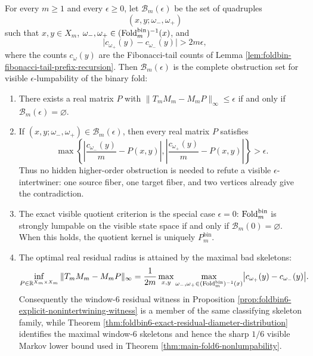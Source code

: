\begin{theorem}\label{thm:foldbin-bad-skeleton-classification}
For every \(m\ge1\) and every \(\epsilon\ge0\), let \(\mathcal B_m(\epsilon)\) be the set of quadruples
\[
(x,y;\omega_-,\omega_+)
\]
such that \(x,y\in X_m\), \(\omega_-,\omega_+\in(\operatorname{Fold}_m^{\mathrm{bin}})^{-1}(x)\), and
\[
\bigl|c_{\omega_+}(y)-c_{\omega_-}(y)\bigr|>2m\epsilon,
\]
where the counts \(c_\omega(y)\) are the Fibonacci-tail counts of Lemma \ref{lem:foldbin-fibonacci-tail-prefix-recursion}.  Then \(\mathcal B_m(\epsilon)\) is the complete obstruction set for visible \(\epsilon\)-lumpability of the binary fold:
\begin{enumerate}[label=\textup{(\roman*)}]
\item There exists a real matrix \(P\) with \(\|T_mM_m-M_mP\|_\infty\le\epsilon\) if and only if \(\mathcal B_m(\epsilon)=\varnothing\).
\item If \((x,y;\omega_-,\omega_+)\in\mathcal B_m(\epsilon)\), then every real matrix \(P\) satisfies
\[
\max\left\{
\left|\frac{c_{\omega_-}(y)}{m}-P(x,y)\right|,
\left|\frac{c_{\omega_+}(y)}{m}-P(x,y)\right|
\right\}
>
\epsilon.
\]
Thus no hidden higher-order obstruction is needed to refute a visible \(\epsilon\)-intertwiner: one source fiber, one target fiber, and two vertices already give the contradiction.
\item The exact visible quotient criterion is the special case \(\epsilon=0\): \(\operatorname{Fold}_m^{\mathrm{bin}}\) is strongly lumpable on the visible state space if and only if \(\mathcal B_m(0)=\varnothing\).  When this holds, the quotient kernel is uniquely \(P_m^{\mathrm{bin}}\).
\item The optimal real residual radius is attained by the maximal bad skeletons:
\[
\inf_{P\in\mathbb{R}^{X_m\times X_m}}
\|T_mM_m-M_mP\|_\infty
=
\frac{1}{2m}
\max_{x,y}\max_{\omega_-,\omega_+\in(\operatorname{Fold}_m^{\mathrm{bin}})^{-1}(x)}
\bigl|c_{\omega_+}(y)-c_{\omega_-}(y)\bigr|.
\]
Consequently the window-\(6\) residual witness in Proposition \ref{prop:foldbin6-explicit-nonintertwining-witness} is a member of the same classifying skeleton family, while Theorem \ref{thm:foldbin6-exact-residual-diameter-distribution} identifies the maximal window-\(6\) skeletons and hence the sharp \(1/6\) visible Markov lower bound used in Theorem \ref{thm:main-fold6-nonlumpability}.
\end{enumerate}
\end{theorem}

